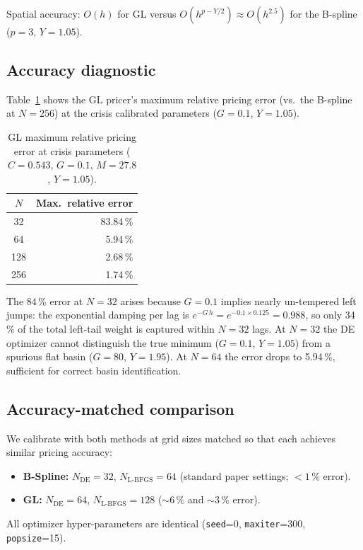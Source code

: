 \documentclass[11pt,a4paper]{article}
\begin{document}
Spatial accuracy: $O(h)$ for GL versus $O(h^{p-Y/2}) \approx O(h^{2.5})$
for the B-spline ($p=3$, $Y=1.05$).

\subsection{Accuracy diagnostic}

Table~\ref{tab:gl_accuracy} shows the GL pricer's maximum relative pricing
error (vs.\ the B-spline at $N=256$) at the crisis calibrated parameters
($G=0.1$, $Y=1.05$).

\begin{table}[ht]
\centering
\caption{GL maximum relative pricing error at crisis parameters
  ($C=0.543$, $G=0.1$, $M=27.8$, $Y=1.05$).}
\label{tab:gl_accuracy}
\begin{tabular}{cr}
\toprule
$N$ & Max.\ relative error \\
\midrule
 32 & 83.84\,\% \\
 64 &  5.94\,\% \\
128 &  2.68\,\% \\
256 &  1.74\,\% \\
\bottomrule
\end{tabular}
\end{table}

The 84\,\% error at $N=32$ arises because $G=0.1$ implies nearly
un-tempered left jumps: the exponential damping per lag is
$e^{-G\,h} = e^{-0.1 \times 0.125} = 0.988$, so only 34\,\% of the total
left-tail weight is captured within $N=32$ lags.
At $N=32$ the DE optimizer cannot distinguish the true minimum
($G=0.1$, $Y=1.05$) from a spurious flat basin ($G=80$, $Y=1.95$).
At $N=64$ the error drops to 5.94\,\%, sufficient for correct basin
identification.

\subsection{Accuracy-matched comparison}

We calibrate with both methods at grid sizes matched so that each achieves
similar pricing accuracy:
\begin{itemize}[noitemsep]
  \item \textbf{B-Spline:} $N_{\text{DE}}=32$, $N_{\text{L-BFGS}}=64$
        (standard paper settings; $<1\,\%$ error).
  \item \textbf{GL:} $N_{\text{DE}}=64$, $N_{\text{L-BFGS}}=128$
        ($\sim6\,\%$ and $\sim3\,\%$ error).
\end{itemize}
All optimizer hyper-parameters are identical
(\texttt{seed}=0, \texttt{maxiter}=300, \texttt{popsize}=15).
\end{document}
